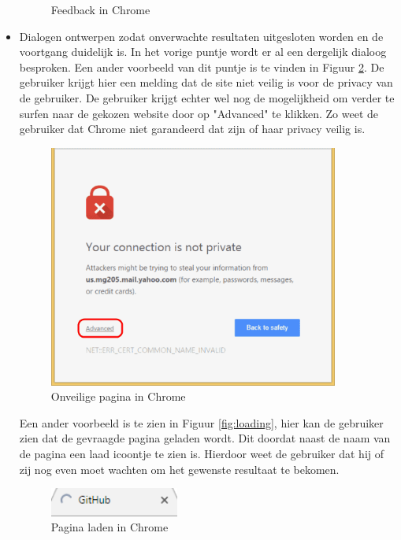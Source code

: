 \documentclass[11pt]{article}
\begin{document}
\begin{itemize}
\begin{figure}
  \caption{Feedback in Chrome}
  \label{fig:nochanges}
\end{figure}
\newpage
\item Dialogen ontwerpen zodat onverwachte resultaten uitgesloten worden en de voortgang duidelijk is.
\newline
In het vorige puntje wordt er al een dergelijk dialoog besproken.
Een ander voorbeeld van dit puntje is te vinden in Figuur \ref{fig:privatecon}. De gebruiker krijgt hier een melding dat de site niet veilig is voor de privacy van de gebruiker. De gebruiker krijgt echter wel nog de mogelijkheid om verder te surfen naar de gekozen website door op "Advanced" te klikken. Zo weet de gebruiker dat Chrome niet garandeerd dat zijn of haar privacy veilig is.
\newline
\begin{figure}
  \centering
    \includegraphics[width=0.9\textwidth]{Chrome-Advanced.png}
  \caption{Onveilige pagina in Chrome}
  \label{fig:privatecon}
\end{figure}
Een ander voorbeeld is te zien in Figuur \ref{fig:loading}, hier kan de gebruiker zien dat de gevraagde pagina geladen wordt. Dit doordat naast de naam van de pagina een laad icoontje te zien is. Hierdoor weet de gebruiker dat hij of zij nog even moet wachten om het gewenste resultaat te bekomen.
\begin{figure}
  \centering
    \includegraphics[width=0.4\textwidth]{Loading.png}
  \caption{Pagina laden in Chrome}

\end{figure}
\end{itemize}
\end{document}
